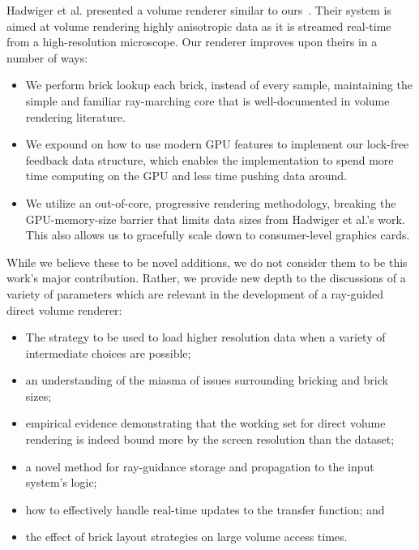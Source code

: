 Hadwiger et al. presented a volume renderer similar to
ours~\cite{Hadwiger:2012:Guided}.  Their system is aimed at volume
rendering highly anisotropic data as it is streamed real-time from a
high-resolution microscope.  Our renderer improves upon theirs in a
number of ways:

\begin{itemize}
  \itemsep0em
  \item We perform brick lookup each brick, instead of every sample,
  maintaining the simple and familiar ray-marching core that is
  well-documented in volume rendering literature.

  \item We expound on how to use modern GPU features to implement our
  lock-free feedback data structure, which enables the implementation
  to spend more time computing on the GPU and less time pushing data
  around.

  \item We utilize an out-of-core, progressive rendering methodology,
  breaking the GPU-memory-size barrier that limits data sizes from
  Hadwiger et al.'s work.  This also allows us to gracefully scale down
  to consumer-level graphics cards.
\end{itemize}

While we believe these to be novel additions, we do not consider them
to be this work's major contribution.  Rather, we provide new depth to
the discussions of a variety of parameters which are relevant in the
development of a ray-guided direct volume renderer:

\begin{itemize}
  \itemsep0em
  \item The strategy to be used to load higher resolution data when a
  variety of intermediate choices are possible;

  \item an understanding of the miasma of issues surrounding bricking
  and brick sizes;

  \item empirical evidence demonstrating that the working set for
  direct volume rendering is indeed bound more by the screen resolution
  than the dataset;

  \item a novel method for ray-guidance storage and propagation to the
  input system's logic;

  \item how to effectively handle real-time updates to the transfer
  function; and

  \item the effect of brick layout strategies on large volume access
  times.

\end{itemize}

